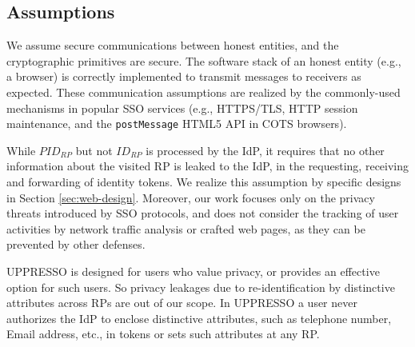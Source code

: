 \subsection{Assumptions}
We assume secure communications between honest entities, and the cryptographic primitives are secure. The software stack of an honest entity (e.g., a browser) is correctly implemented to transmit messages to receivers as expected.
These communication assumptions are realized by the commonly-used mechanisms in popular SSO services
 (e.g., HTTPS/TLS, HTTP session maintenance, and the \verb+postMessage+ HTML5 API in COTS browsers).

While $PID_{RP}$ but not $ID_{RP}$ is processed by the IdP,
it requires that no other information about the visited RP is leaked to the IdP,
 in the requesting, receiving and forwarding of identity tokens.
We realize this assumption by specific designs in Section \ref{sec:web-design}.
Moreover, our work focuses only on the privacy threats introduced by SSO protocols, and does not consider the tracking of user activities by network traffic analysis or crafted web pages, as they can be prevented by other defenses.


UPPRESSO is designed for users who value privacy,
        or provides an effective option for such users.
So privacy leakages due to re-identification by distinctive attributes across RPs are out of our scope.
In UPPRESSO a user never authorizes the IdP to enclose distinctive attributes, such as telephone number, Email address, etc., in tokens or sets such attributes at any RP.
